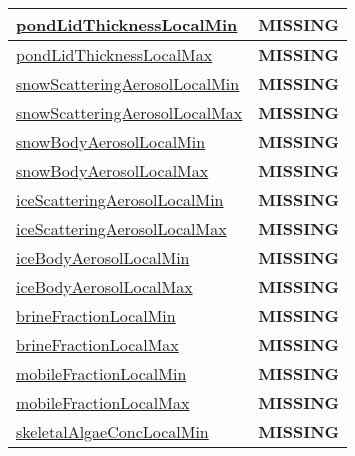 {\begin{center}
\begin{longtable}{| p{2.0in} | p{4.0in} |}
    \hyperref[subsec:var_sec_tracer_monotonicity_pondLidThicknessLocalMin]{pondLidThicknessLocalMin} & {\bf \color{red} MISSING} \\
    \hline
    \hyperref[subsec:var_sec_tracer_monotonicity_pondLidThicknessLocalMax]{pondLidThicknessLocalMax} & {\bf \color{red} MISSING} \\
    \hline
    \hyperref[subsec:var_sec_tracer_monotonicity_snowScatteringAerosolLocalMin]{snowScatteringAerosolLocalMin} & {\bf \color{red} MISSING} \\
    \hline
    \hyperref[subsec:var_sec_tracer_monotonicity_snowScatteringAerosolLocalMax]{snowScatteringAerosolLocalMax} & {\bf \color{red} MISSING} \\
    \hline
    \hyperref[subsec:var_sec_tracer_monotonicity_snowBodyAerosolLocalMin]{snowBodyAerosolLocalMin} & {\bf \color{red} MISSING} \\
    \hline
    \hyperref[subsec:var_sec_tracer_monotonicity_snowBodyAerosolLocalMax]{snowBodyAerosolLocalMax} & {\bf \color{red} MISSING} \\
    \hline
    \hyperref[subsec:var_sec_tracer_monotonicity_iceScatteringAerosolLocalMin]{iceScatteringAerosolLocalMin} & {\bf \color{red} MISSING} \\
    \hline
    \hyperref[subsec:var_sec_tracer_monotonicity_iceScatteringAerosolLocalMax]{iceScatteringAerosolLocalMax} & {\bf \color{red} MISSING} \\
    \hline
    \hyperref[subsec:var_sec_tracer_monotonicity_iceBodyAerosolLocalMin]{iceBodyAerosolLocalMin} & {\bf \color{red} MISSING} \\
    \hline
    \hyperref[subsec:var_sec_tracer_monotonicity_iceBodyAerosolLocalMax]{iceBodyAerosolLocalMax} & {\bf \color{red} MISSING} \\
    \hline
    \hyperref[subsec:var_sec_tracer_monotonicity_brineFractionLocalMin]{brineFractionLocalMin} & {\bf \color{red} MISSING} \\
    \hline
    \hyperref[subsec:var_sec_tracer_monotonicity_brineFractionLocalMax]{brineFractionLocalMax} & {\bf \color{red} MISSING} \\
    \hline
    \hyperref[subsec:var_sec_tracer_monotonicity_mobileFractionLocalMin]{mobileFractionLocalMin} & {\bf \color{red} MISSING} \\
    \hline
    \hyperref[subsec:var_sec_tracer_monotonicity_mobileFractionLocalMax]{mobileFractionLocalMax} & {\bf \color{red} MISSING} \\
    \hline
    \hyperref[subsec:var_sec_tracer_monotonicity_skeletalAlgaeConcLocalMin]{skeletalAlgaeConcLocalMin} & {\bf \color{red} MISSING} \\

\end{longtable}
\end{center}}
